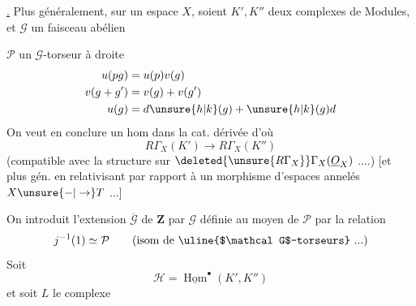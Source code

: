 \uline{.}
Plus généralement, sur un espace   $X$, soient $K',K''$ deux complexes de Modules, et
$\mathcal G$ un faisceau abélien

$\mathcal P$ un $\mathcal G$-torseur à droite
\[
\begin{aligned}
u(pg)&=u(p)v(g)\\
v(g+g')&=v(g)+v(g')\\
u(g)&=d\unsure{h|k}(g)+\unsure{h|k}(g)d
\end{aligned}
\]
On veut en conclure un hom dans la cat. dérivée  d'où
\[
R\Gamma_X(K')\longrightarrow R\Gamma_X(K'')
\]
(compatible avec la structure sur $\deleted{\unsure{R\Gamma_X}}\Gamma_X(\underline O_X)$ ....)
[et plus gén. en relativisant par rapport à un morphisme d'espaces annelés $X\unsure{\mathbin{-}|\to}T$ ...]

On introduit l'extension $\overline{\mathcal G}$ de $\mathbf Z$ par $\mathcal G$
définie au moyen de $\mathcal P$ par la relation
\[
j^{-1}(1)\simeq\mathcal P\qquad(\text{isom de }\uline{$\mathcal G$-torseurs}\text{ ...})
\]
Soit
\[
\mathcal H=\underline{\operatorname{Hom}}^\bullet(K',K'')
\]
et soit $L$ le complexe
